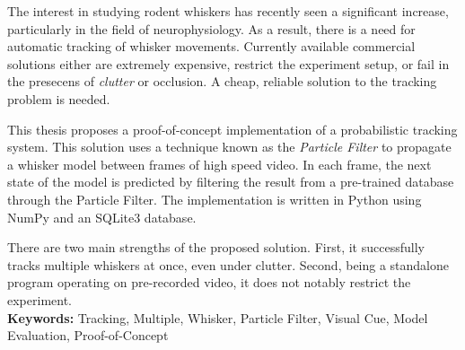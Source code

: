 The interest in studying rodent whiskers has recently seen a significant increase, particularly in the field of neurophysiology. As a result, there is a need for automatic tracking of whisker movements. Currently available commercial solutions either are extremely expensive, restrict the experiment setup, or fail in the presecens of \emph{clutter} or occlusion. A cheap, reliable solution to the tracking problem is needed.

This thesis proposes a proof-of-concept implementation of a probabilistic tracking system. This solution uses a technique known as the \emph{Particle Filter} to propagate a whisker model between frames of high speed video. In each frame, the next state of the model is predicted by filtering the result from a pre-trained database through the Particle Filter. The implementation is written in Python using NumPy and an SQLite3 database.

There are two main strengths of the proposed solution. First, it successfully tracks multiple whiskers at once, even under clutter. Second, being a standalone program operating on pre-recorded video, it does not notably restrict the experiment.\\

\textbf{Keywords:} Tracking, Multiple, Whisker, Particle Filter, Visual Cue, Model Evaluation, Proof-of-Concept
